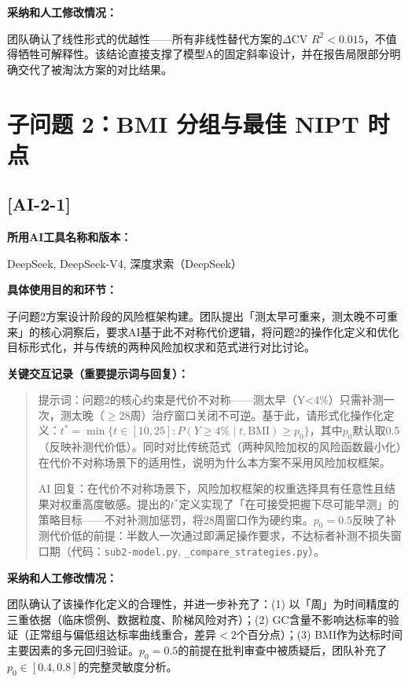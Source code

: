 \documentclass[12pt,a4paper]{ctexart}
\begin{document}
\textbf{采纳和人工修改情况：}

团队确认了线性形式的优越性——所有非线性替代方案的$\Delta$CV $R^2<0.015$，不值得牺牲可解释性。该结论直接支撑了模型A的固定斜率设计，并在报告局限部分明确交代了被淘汰方案的对比结果。

\section*{子问题 2：BMI 分组与最佳 NIPT 时点}

\subsection*{[AI-2-1]}

\textbf{所用AI工具名称和版本：}

DeepSeek, DeepSeek-V4, 深度求索（DeepSeek）

\textbf{具体使用目的和环节：}

子问题2方案设计阶段的风险框架构建。团队提出「测太早可重来，测太晚不可重来」的核心洞察后，要求AI基于此不对称代价逻辑，将问题2的操作化定义和优化目标形式化，并与传统的两种风险加权求和范式进行对比讨论。

\textbf{关键交互记录（重要提示词与回复）：}

\begin{quote}
提示词：问题2的核心约束是代价不对称——测太早（Y<4\%）只需补测一次，测太晚（$\geq$28周）治疗窗口关闭不可逆。基于此，请形式化操作化定义：$t^* = \min\{t\in[10,25]: P(Y\geq4\%\mid t, \text{BMI})\geq p_0\}$，其中$p_0$默认取0.5（反映补测代价低）。同时对比传统范式（两种风险加权的风险函数最小化）在代价不对称场景下的适用性，说明为什么本方案不采用风险加权框架。

AI 回复：在代价不对称场景下，风险加权框架的权重选择具有任意性且结果对权重高度敏感。提出的$t^*$定义实现了「在可接受把握下尽可能早测」的策略目标——不对补测加惩罚，将28周窗口作为硬约束。$p_0=0.5$反映了补测代价低的前提：半数人一次通过即满足操作要求，不达标者补测不损失窗口期（代码：\texttt{sub2-model.py}, \texttt{\_compare\_strategies.py}）。
\end{quote}

\textbf{采纳和人工修改情况：}

团队确认了该操作化定义的合理性，并进一步补充了：(1) 以「周」为时间精度的三重依据（临床惯例、数据粒度、阶梯风险对齐）；(2) GC含量不影响达标率的验证（正常组与偏低组达标率曲线重合，差异$<2$个百分点）；(3) BMI作为达标时间主要因素的多元回归验证。$p_0=0.5$的前提在批判审查中被质疑后，团队补充了$p_0\in[0.4,0.8]$的完整灵敏度分析。
\end{document}
